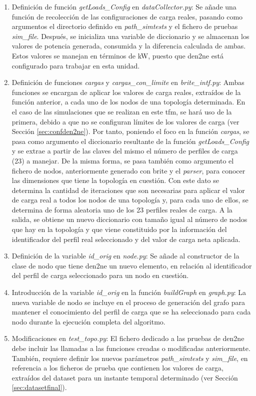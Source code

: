 \begin{enumerate}
    \item Definición de función \textit{getLoads\_Config} en \textit{dataCollector.py}: Se añade una función de recolección de las configuraciones de carga reales, pasando como argumentos el directorio definido en \textit{path\_simtests} y el fichero de pruebas \textit{sim\_file}. Después, se inicializa una variable de diccionario y se almacenan los valores de potencia generada, consumida y la diferencia calculada de ambas. Estos valores se manejan en términos de kW, puesto que \gls{den2ne} está configurado para trabajar en esta unidad.
    \item Definición de funciones \textit{cargas} y \textit{cargas\_con\_limite} en \textit{brite\_intf.py}: Ambas funciones se encargan de aplicar los valores de carga reales, extraídos de la función anterior, a cada uno de los nodos de una topología determinada. En el caso de las simulaciones que se realizan en este \gls{tfm}, se hará uso de la primera, debido a que no se configuran límites de los valores de carga (ver Sección \ref{sec:confden2ne}). Por tanto, poniendo el foco en la función \textit{cargas}, se pasa como argumento el diccionario resultante de la función \textit{getLoads\_Config} y se extrae a partir de las claves del mismo el número de perfiles de carga (23) a manejar. De la misma forma, se pasa también como argumento el fichero de nodos, anteriormente generado con \gls{brite} y el \textit{parser}, para conocer las dimensiones que tiene la topología en cuestión. Con este dato se determina la cantidad de iteraciones que son necesarias para aplicar el valor de carga real a todos los nodos de una topología y, para cada uno de ellos, se determina de forma aleatoria uno de los 23 perfiles reales de carga. A la salida, se obtiene un nuevo diccionario con tamaño igual al número de nodos que hay en la topología y que viene constituido por la información del identificador del perfil real seleccionado y del valor de carga neta aplicada.
    \item Definición de la variable \textit{id\_orig} en \textit{node.py}: Se añade al constructor de la clase de nodo que tiene \gls{den2ne} un nuevo elemento, en relación al identificador del perfil de carga seleccionado para un nodo en cuestión.
    \item Introducción de la variable \textit{id\_orig} en la función \textit{buildGraph} en \textit{graph.py}: La nueva variable de nodo se incluye en el proceso de generación del grafo para mantener el conocimiento del perfil de carga que se ha seleccionado para cada nodo durante la ejecución completa del algoritmo.
    \item Modificaciones en \textit{test\_topo.py}: El fichero dedicado a las pruebas de \gls{den2ne} debe incluir las llamadas a las funciones creadas o modificadas anteriormente. También, requiere definir los nuevos parámetros \textit{path\_simtests} y \textit{sim\_file}, en referencia a los ficheros de prueba que contienen los valores de carga, extraídos del dataset para un instante temporal determinado (ver Sección \ref{sec:datasetfinal}).
\end{enumerate} 


